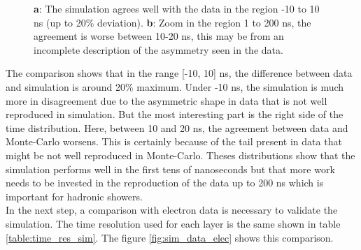 \documentclass[twoside,a4paper,11pt]{article}
\begin{document}
\begin{figure}[htbp]
	\hfill
	\caption[]{\textbf{a}: The simulation agrees well with the data in the region -10 to 10 ns (up to 20\% deviation). \textbf{b}: Zoom in the region 1 to 200 ns, the agreement is worse between 10-20 ns, this may be from an incomplete description of the asymmetry seen in the data.}
	\label{fig:sim_data_muon}
\end{figure}
The comparison shows that in the range [-10, 10] ns, the difference between data and simulation is around 20\% maximum. Under -10 ns, the simulation is much more in disagreement due to the asymmetric shape in data that is not well reproduced in simulation. But the most interesting part is the right side of the time distribution. Here, between 10 and 20 ns, the agreement between data and Monte-Carlo worsens. This is certainly because of the tail present in data that might be not well reproduced in Monte-Carlo. Theses distributions show that the simulation performs well in the first tens of nanoseconds but that more work needs to be invested in the reproduction of the data up to 200 ns which is important for hadronic showers.\\
In the next step, a comparison with electron data is necessary to validate the simulation. The time resolution used for each layer is the same shown in table \ref{table:time_res_sim}. The figure \ref{fig:sim_data_elec} shows this comparison.
\end{document}
